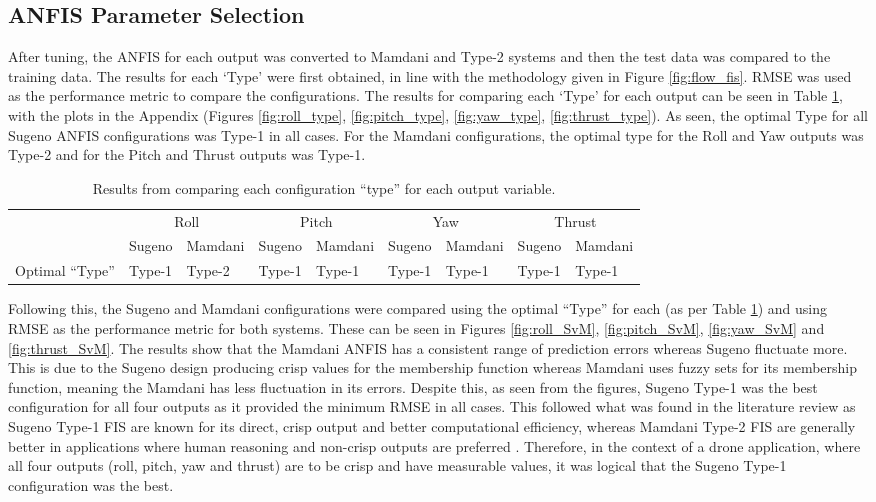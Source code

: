 \subsection{ANFIS Parameter Selection}
After tuning, the ANFIS for each output was converted to Mamdani and Type-2 systems and then the test data was compared to the training data. The results for each `Type' were first obtained, in line with the methodology given in Figure \ref{fig:flow_fis}. RMSE was used as the performance metric to compare the configurations. The results for comparing each `Type' for each output can be seen in Table \ref{tab:results2}, with the plots in the Appendix (Figures \ref{fig:roll_type}, \ref{fig:pitch_type}, \ref{fig:yaw_type}, \ref{fig:thrust_type}). As seen, the optimal Type for all Sugeno ANFIS configurations was Type-1 in all cases. For the Mamdani configurations, the optimal type for the Roll and Yaw outputs was Type-2 and for the Pitch and Thrust outputs was Type-1.
\begin{table}[H]
\centering
    \begin{tabular}{@{}lllllllll@{}}
        \toprule
        & \multicolumn{2}{c}{Roll} & \multicolumn{2}{c}{Pitch} & \multicolumn{2}{c}{Yaw} & \multicolumn{2}{c}{Thrust} \\
        & Sugeno     & Mamdani     & Sugeno      & Mamdani     & Sugeno     & Mamdani    & Sugeno      & Mamdani      \\
        \midrule
        Optimal   “Type” & Type-1     & Type-2      & Type-1      & Type-1      & Type-1     & Type-1     & Type-1      & Type-1      \\
        \bottomrule
    \end{tabular}
    \caption{Results from comparing each configuration ``type'' for each output variable.}
    \label{tab:results2}
\end{table}
Following this, the Sugeno and Mamdani configurations were compared using the optimal ``Type'' for each (as per Table \ref{tab:results2}) and using RMSE as the performance metric for both systems. These can be seen in Figures \ref{fig:roll_SvM}, \ref{fig:pitch_SvM}, \ref{fig:yaw_SvM} and \ref{fig:thrust_SvM}. The results show that the Mamdani ANFIS has a consistent range of prediction errors whereas Sugeno fluctuate more. This is due to the Sugeno design producing crisp values for the membership function whereas Mamdani uses fuzzy sets for its membership function, meaning the Mamdani has less fluctuation in its errors. Despite this, as seen from the figures, Sugeno Type-1 was the best configuration for all four outputs as it provided the minimum RMSE in all cases. This followed what was found in the literature review as Sugeno Type-1 FIS are known for its direct, crisp output and better computational efficiency, whereas Mamdani Type-2 FIS are generally better in applications where human reasoning and non-crisp outputs are preferred \cite{zain3,boxi12}. Therefore, in the context of a drone application, where all four outputs (roll, pitch, yaw and thrust) are to be crisp and have measurable values, it was logical that the Sugeno Type-1 configuration was the best. 
